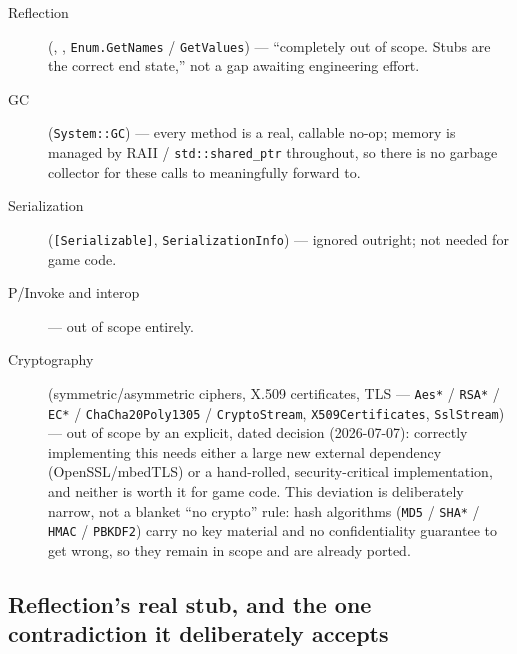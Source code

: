 \begin{description}
  \item[Reflection] (, ,
  \texttt{Enum.GetNames} / \texttt{GetValues}) --- ``completely out of scope. Stubs are the
  correct end state,'' not a gap awaiting engineering effort.
  \item[GC] (\texttt{System::GC}) --- every method is a real, callable no-op; memory is managed
  by RAII / \texttt{std::shared\_ptr} throughout, so there is no garbage collector for these
  calls to meaningfully forward to.
  \item[Serialization] (\texttt{[Serializable]}, \texttt{SerializationInfo}) --- ignored
  outright; not needed for game code.
  \item[P/Invoke and interop] --- out of scope entirely.
  \item[Cryptography] (symmetric/asymmetric ciphers, X.509 certificates, TLS ---
  \texttt{Aes*} / \texttt{RSA*} / \texttt{EC*} / \texttt{ChaCha20Poly1305} / \texttt{CryptoStream},
  \texttt{X509Certificates}, \texttt{SslStream}) --- out of scope by an explicit, dated decision
  (2026-07-07): correctly implementing this needs either a large new external dependency
  (OpenSSL/mbedTLS) or a hand-rolled, security-critical implementation, and neither is worth it
  for game code. This deviation is deliberately narrow, not a blanket ``no crypto'' rule: hash
  algorithms (\texttt{MD5} / \texttt{SHA*} / \texttt{HMAC} / \texttt{PBKDF2}) carry no key material and
  no confidentiality guarantee to get wrong, so they remain in scope and are already ported.
\end{description}

\subsection{Reflection's real stub, and the one contradiction it deliberately accepts}


